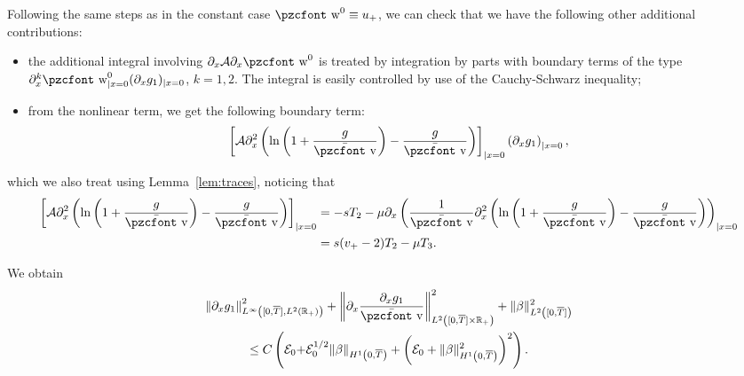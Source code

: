 \documentclass[10pt]{amsart}
\theoremstyle{definition}\newtheorem{defi}[theo]{Definition}\newtheorem{rema}[theo]{Remark}\newtheorem{exam}[theo]{Example}\newtheorem{exem}[theo]{Example}\newtheorem{nota}[theo]{Notation}
\newcommand{\mathpzc}[1]{\text{\pzcfont #1}}
\newcommand{\R}{\mathbb{R}}
\newcommand{\p}{\partial}
\newcommand{\bv}{\bar{\mathpzc{v}}}
\newcommand{\cA}{\mathcal A}
\newcommand{\cE}{\mathcal E}
\newcommand{\tw}{\mathpzc{w}}
\begin{document}
Following the same steps as in the constant case $\tw^0 \equiv u_+$, we can check that we have the following other additional contributions:
\begin{itemize}
\item the additional integral involving $\partial_x \cA \partial_x \tw^0$ is treated by integration by parts with boundary terms of the type $\partial^k_x \tw^0_{|x=0} (\partial_x g_1)_{|x=0}$, $k=1,2$. The integral is easily controlled by use of the Cauchy-Schwarz inequality;
\item from the nonlinear term, we get the following boundary term:
\[
\left[\cA \partial^2_x \left(\ln \left(1+ \frac{g}{\bv}\right) - \frac{g}{\bv} \right) \right]_{|x=0} \left(\partial_x g_1\right)_{|x=0},
\]
\end{itemize}
which we also treat using Lemma~\ref{lem:traces}, noticing that
\begin{equation}\label{trace-A-dx2-NL}
\begin{split}
\left[\cA \partial^2_x \left(\ln \left(1+ \frac{g}{\bv}\right) - \frac{g}{\bv} \right) \right]_{|x=0}&=-s T_2 -\mu\p_x\left(\frac{1}{\bv}
\partial^2_x \left(\ln \left(1+ \frac{g}{\bv}\right) - \frac{g}{\bv} \right)\right)_{|x=0}\\
&=s(v_+-2)T_2-\mu T_3.
\end{split}
\end{equation}

We obtain
\begin{multline*}
\left\|\p_x g_1\right\|_{L^\infty\left([0,\overline{T}], L^2(\mathbb R_+)\right)}^2 + \left\|\p_x \frac{\p_x g_1}{\bv}\right\|^2_{L^2\left([0,\overline{T}]\times \R_+\right)}+ \|\beta\|_{L^2\left([0,\overline{T}]\right)}^2\\
\leq C\left(\cE_0 {+\cE_0^{1/2}\|\beta\|_{H^1\left(0,\overline{T}\right)}} +\left(\cE_0 + \|\beta\|_{H^1\left(0,\overline{T}\right)}^2\right)^2 \right).
\end{multline*}



\end{document}
